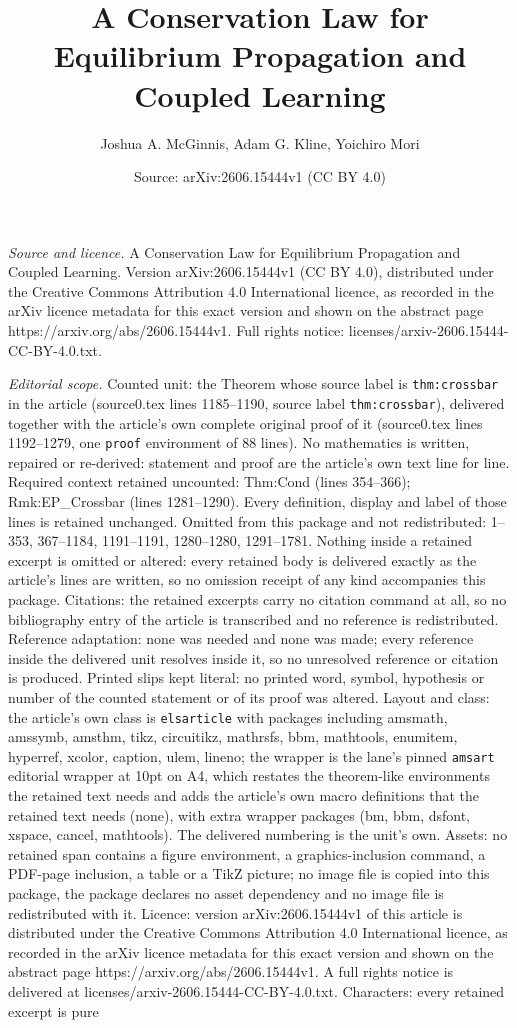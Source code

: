 \documentclass[10pt,a4paper]{amsart}
\title[A Conservation Law for Equilibrium Propagation and Coupled L]{A Conservation Law for Equilibrium Propagation and Coupled Learning}
\author{Joshua A. McGinnis, Adam G. Kline, Yoichiro Mori}
\date{Source: arXiv:2606.15444v1 (CC BY 4.0)}
\begin{document}
\maketitle

\noindent\emph{Source and licence.} A Conservation Law for Equilibrium Propagation and Coupled Learning. Version arXiv:2606.15444v1 (CC BY 4.0), distributed under the Creative Commons Attribution 4.0 International licence, as recorded in the arXiv licence metadata for this exact version and shown on the abstract page https://arxiv.org/abs/2606.15444v1. Full rights notice: licenses/arxiv-2606.15444-CC-BY-4.0.txt.\par\smallskip

\noindent\textit{Editorial scope.} Counted unit: the Theorem whose source label is \texttt{thm:crossbar} in the article (source0.tex lines 1185--1190, source label \texttt{thm:crossbar}), delivered together with the article's own complete original proof of it (source0.tex lines 1192--1279, one \texttt{proof} environment of 88 lines). No mathematics is written, repaired or re-derived: statement and proof are the article's own text line for line. Required context retained uncounted: Thm:Cond (lines 354--366); Rmk:EP\_Crossbar (lines 1281--1290). Every definition, display and label of those lines is retained unchanged. Omitted from this package and not redistributed: 1--353, 367--1184, 1191--1191, 1280--1280, 1291--1781. Nothing inside a retained excerpt is omitted or altered: every retained body is delivered exactly as the article's lines are written, so no omission receipt of any kind accompanies this package. Citations: the retained excerpts carry no citation command at all, so no bibliography entry of the article is transcribed and no reference is redistributed. Reference adaptation: none was needed and none was made; every reference inside the delivered unit resolves inside it, so no unresolved reference or citation is produced. Printed slips kept literal: no printed word, symbol, hypothesis or number of the counted statement or of its proof was altered. Layout and class: the article's own class is \texttt{elsarticle} with packages including amsmath, amssymb, amsthm, tikz, circuitikz, mathrsfs, bbm, mathtools, enumitem, hyperref, xcolor, caption, ulem, lineno; the wrapper is the lane's pinned \texttt{amsart} editorial wrapper at 10pt on A4, which restates the theorem-like environments the retained text needs and adds the article's own macro definitions that the retained text needs (none), with extra wrapper packages (bm, bbm, dsfont, xspace, cancel, mathtools). The delivered numbering is the unit's own. Assets: no retained span contains a figure environment, a graphics-inclusion command, a PDF-page inclusion, a table or a TikZ picture; no image file is copied into this package, the package declares no asset dependency and no image file is redistributed with it. Licence: version arXiv:2606.15444v1 of this article is distributed under the Creative Commons Attribution 4.0 International licence, as recorded in the arXiv licence metadata for this exact version and shown on the abstract page https://arxiv.org/abs/2606.15444v1. A full rights notice is delivered at licenses/arxiv-2606.15444-CC-BY-4.0.txt. Characters: every retained excerpt is pure 
\end{document}
